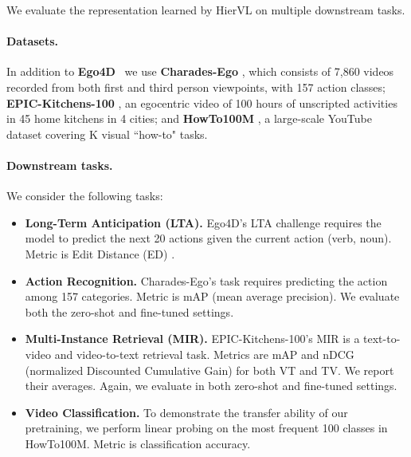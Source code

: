 \documentclass[10pt,twocolumn,letterpaper]{article}
\newcommand{\modelname}[0]{{HierVL}}
\begin{document}
We evaluate the representation learned by \modelname{} on  multiple downstream tasks.
 
\vspace*{-0.15in}
\paragraph{Datasets.}  In addition to \textbf{Ego4D}~\cite{ego4d} we use 
\textbf{Charades-Ego} \cite{charades-ego}, which consists of 7,860 videos recorded from both first and third person viewpoints, with 157 action classes; \textbf{EPIC-Kitchens-100} \cite{epic-kitchens-100,epic-ijcv}, an egocentric video of 100 hours of unscripted activities in 45 home kitchens in 4 cities; and \textbf{HowTo100M} \cite{howto100m}, a large-scale YouTube dataset covering K visual ``how-to" tasks. 
















\paragraph{Downstream tasks.} We consider the following tasks:
\begin{itemize}
\item \textbf{Long-Term Anticipation (LTA).} Ego4D's LTA challenge requires the model to predict the next 20 actions given the current action (verb, noun). Metric is Edit Distance (ED) \cite{ego4d}. 

\item \textbf{Action Recognition.} Charades-Ego's task requires predicting the action among 157 categories. Metric is mAP (mean average precision). We evaluate both the zero-shot and fine-tuned settings.

\item \textbf{Multi-Instance Retrieval (MIR).} EPIC-Kitchens-100's MIR is a text-to-video and video-to-text retrieval task. Metrics are mAP and nDCG (normalized Discounted Cumulative Gain) for both VT and TV. We report their averages. Again, we evaluate in both zero-shot and fine-tuned settings.

\item \textbf{Video Classification.} To demonstrate the transfer ability of our pretraining, we perform linear probing on the most frequent 100 classes in HowTo100M. Metric is classification accuracy.
\end{itemize}
\end{document}
